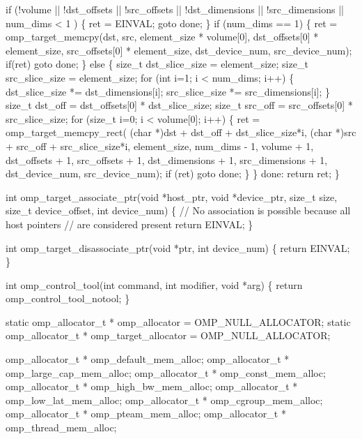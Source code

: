 {\begin{codepar}
    if (!volume || !dst\_offsets || !src\_offsets
            || !dst\_dimensions || !src\_dimensions
            || num\_dims < 1 ) \{
        ret = EINVAL;
        goto done;
    \}
    if (num\_dims == 1) \{
        ret = omp\_target\_memcpy(dst, src,
                                element\_size * volume[0],
                                dst\_offsets[0] * element\_size,
                                src\_offsets[0] * element\_size,
                                dst\_device\_num, src\_device\_num);
        if(ret) goto done;
    \} else \{
        size\_t dst\_slice\_size = element\_size;
        size\_t src\_slice\_size = element\_size;
        for (int i=1; i < num\_dims; i++) \{
            dst\_slice\_size *= dst\_dimensions[i];
            src\_slice\_size *= src\_dimensions[i];
        \}
        size\_t dst\_off = dst\_offsets[0] * dst\_slice\_size;
        size\_t src\_off = src\_offsets[0] * src\_slice\_size;
        for (size\_t i=0; i < volume[0]; i++) \{
            ret = omp\_target\_memcpy\_rect(
                        (char *)dst + dst\_off + dst\_slice\_size*i,
                        (char *)src + src\_off + src\_slice\_size*i,
                        element\_size,
                        num\_dims - 1,
                        volume + 1,
                        dst\_offsets + 1,
                        src\_offsets + 1,
                        dst\_dimensions + 1,
                        src\_dimensions + 1,
                        dst\_device\_num,
                        src\_device\_num);
            if (ret) goto done;
        \}
    \}
done:
    return ret;
\}

int omp\_target\_associate\_ptr(void *host\_ptr, void *device\_ptr,
                             size\_t size, size\_t device\_offset,
                             int device\_num)
\{
    // No association is possible because all host pointers 
    // are considered present
    return EINVAL;
\}

int omp\_target\_disassociate\_ptr(void *ptr, int device\_num)
\{
    return EINVAL;
\}


int omp\_control\_tool(int command, int modifier, void *arg)
\{
    return omp_control_tool_notool;
\}

static omp\_allocator\_t * omp\_allocator = OMP\_NULL\_ALLOCATOR;
static omp\_allocator\_t * omp\_target\_allocator = OMP\_NULL\_ALLOCATOR;

omp_allocator_t * omp_default_mem_alloc;
omp_allocator_t * omp_large_cap_mem_alloc;
omp_allocator_t * omp_const_mem_alloc;
omp_allocator_t * omp_high_bw_mem_alloc;
omp_allocator_t * omp_low_lat_mem_alloc;
omp_allocator_t * omp_cgroup_mem_alloc;
omp_allocator_t * omp_pteam_mem_alloc;
omp_allocator_t * omp_thread_mem_alloc;


\end{codepar}}
